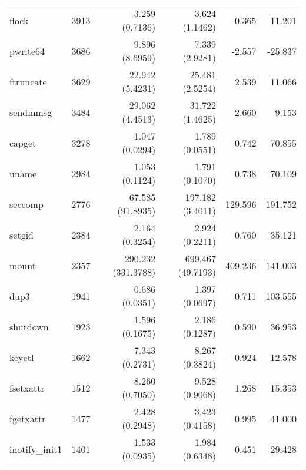 \begin{longtable}{>{\ttfamily}lrrrrr}
                          flock &       3913 &              3.259 (0.7136) &            3.624 (1.1462) &           0.365 &       11.201 \\
                       pwrite64 &       3686 &              9.896 (8.6959) &            7.339 (2.9281) &          -2.557 &      -25.837 \\
                      ftruncate &       3629 &             22.942 (5.4231) &           25.481 (2.5254) &           2.539 &       11.066 \\
                       sendmmsg &       3484 &             29.062 (4.4513) &           31.722 (1.4625) &           2.660 &        9.153 \\
                         capget &       3278 &              1.047 (0.0294) &            1.789 (0.0551) &           0.742 &       70.855 \\
                          uname &       2984 &              1.053 (0.1124) &            1.791 (0.1070) &           0.738 &       70.109 \\
                        seccomp &       2776 &            67.585 (91.8935) &          197.182 (3.4011) &         129.596 &      191.752 \\
                         setgid &       2384 &              2.164 (0.3254) &            2.924 (0.2211) &           0.760 &       35.121 \\
                          mount &       2357 &          290.232 (331.3788) &         699.467 (49.7193) &         409.236 &      141.003 \\
                           dup3 &       1941 &              0.686 (0.0351) &            1.397 (0.0697) &           0.711 &      103.555 \\
                       shutdown &       1923 &              1.596 (0.1675) &            2.186 (0.1287) &           0.590 &       36.953 \\
                         keyctl &       1662 &              7.343 (0.2731) &            8.267 (0.3824) &           0.924 &       12.578 \\
                      fsetxattr &       1512 &              8.260 (0.7050) &            9.528 (0.9068) &           1.268 &       15.353 \\
                      fgetxattr &       1477 &              2.428 (0.2948) &            3.423 (0.4158) &           0.995 &       41.000 \\
                 inotify\_init1 &       1401 &              1.533 (0.0935) &            1.984 (0.6348) &           0.451 &       29.428 \\

\end{longtable}
